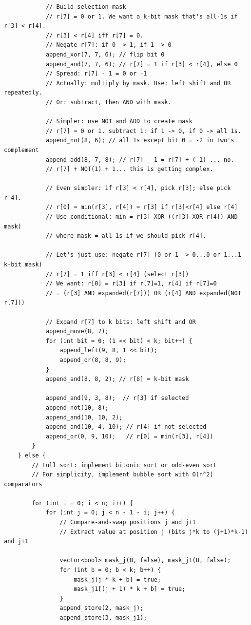 \documentclass[11pt,a4paper]{article}
\begin{document}
\begin{lstlisting}
            // Build selection mask
            // r[7] = 0 or 1. We want a k-bit mask that's all-1s if r[3] < r[4].
            // r[3] < r[4] iff r[7] = 0.
            // Negate r[7]: if 0 -> 1, if 1 -> 0
            append_xor(7, 7, 6); // flip bit 0
            append_and(7, 7, 6); // r[7] = 1 if r[3] < r[4], else 0
            // Spread: r[7] - 1 = 0 or -1
            // Actually: multiply by mask. Use: left shift and OR repeatedly.
            // Or: subtract, then AND with mask.

            // Simpler: use NOT and ADD to create mask
            // r[7] = 0 or 1. subtract 1: if 1 -> 0, if 0 -> all 1s.
            append_not(8, 6); // all 1s except bit 0 = -2 in two's complement
            append_add(8, 7, 8); // r[7] - 1 = r[7] + (-1) ... no.
            // r[7] + NOT(1) + 1... this is getting complex.

            // Even simpler: if r[3] < r[4], pick r[3]; else pick r[4].
            // r[0] = min(r[3], r[4]) = r[3] if r[3]<r[4] else r[4]
            // Use conditional: min = r[3] XOR ((r[3] XOR r[4]) AND mask)
            // where mask = all 1s if we should pick r[4].

            // Let's just use: negate r[7] (0 or 1 -> 0...0 or 1...1 k-bit mask)
            // r[7] = 1 iff r[3] < r[4] (select r[3])
            // We want: r[0] = r[3] if r[7]=1, r[4] if r[7]=0
            // = (r[3] AND expanded(r[7])) OR (r[4] AND expanded(NOT r[7]))

            // Expand r[7] to k bits: left shift and OR
            append_move(8, 7);
            for (int bit = 0; (1 << bit) < k; bit++) {
                append_left(9, 8, 1 << bit);
                append_or(8, 8, 9);
            }
            append_and(8, 8, 2); // r[8] = k-bit mask

            append_and(9, 3, 8);  // r[3] if selected
            append_not(10, 8);
            append_and(10, 10, 2);
            append_and(10, 4, 10); // r[4] if not selected
            append_or(0, 9, 10);   // r[0] = min(r[3], r[4])
        }
    } else {
        // Full sort: implement bitonic sort or odd-even sort
        // For simplicity, implement bubble sort with O(n^2) comparators

        for (int i = 0; i < n; i++) {
            for (int j = 0; j < n - 1 - i; j++) {
                // Compare-and-swap positions j and j+1
                // Extract value at position j (bits j*k to (j+1)*k-1) and j+1

                vector<bool> mask_j(B, false), mask_j1(B, false);
                for (int b = 0; b < k; b++) {
                    mask_j[j * k + b] = true;
                    mask_j1[(j + 1) * k + b] = true;
                }
                append_store(2, mask_j);
                append_store(3, mask_j1);


\end{lstlisting}
\end{document}
